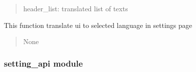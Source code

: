 \documentclass[letterpaper,10pt,english]{sphinxmanual}
\begin{document}
\begin{savenotes}
\begin{fulllineitems}
\begin{savenotes}
\begin{fulllineitems}
\begin{quote}
\begin{description}
\sphinxAtStartPar
header\_list: translated list of texts

\end{description}\end{quote}

\end{fulllineitems}\end{savenotes}


\begin{savenotes}\begin{fulllineitems}
\label{\detokenize{setting/setting_UI:oxin.setting_UI.UI_main_window.translate_ui}}
\pysigstartsignatures
{}
\pysigstopsignatures
\sphinxAtStartPar
This function translate ui to selected language in settings page
\begin{quote}\begin{description}
\sphinxAtStartPar
None

\end{description}\end{quote}

\end{fulllineitems}\end{savenotes}


\end{fulllineitems}\end{savenotes}


\sphinxstepscope


\subsubsection{setting\_api module}
\label{\detokenize{setting/setting_api:module-oxin.setting_api}}\label{\detokenize{setting/setting_api:setting-api-module}}\label{\detokenize{setting/setting_api::doc}}
\end{document}
